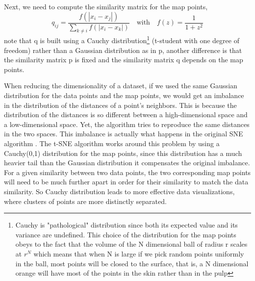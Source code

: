 \documentclass[12pt]{report}
\begin{document}
Next, we need to compute the similarity matrix for the map points,
\begin{equation}
q_{ij} = \frac{f(\left| x_i - x_j\right|)}{\displaystyle\sum_{k \neq i} f(\left| x_i - x_k\right|)} \quad \textrm{with} \quad f(z) = \frac{1}{1+z^2}
\end{equation}
note that q is built using a Cauchy distribution\footnote{Cauchy is "pathological" distribution since both its expected value and its variance are undefined. This choice of the distribution for the map points obeys to the fact that the volume of the N dimensional ball of radius r scales at $r^N$ which means that when N is large if we pick random points uniformly in the ball, most points will be closed to the surface, that is, a N dimensional orange will have most of the points in the skin rather than in the pulp} 
(t-student with one degree of freedom) rather than a Gaussian distribution as in p, another difference is that the similarity matrix p is fixed and the similarity matrix q depends on the map points. 



When reducing the dimensionality of a dataset, if we used the same Gaussian distribution for the data points and the map points, we would get an imbalance in the distribution of the distances of a point's neighbors. This is because the distribution of the distances is so different between a high-dimensional space and a low-dimensional space. Yet, the algorithm tries to reproduce the same distances in the two spaces. This imbalance is actually what happens in the original SNE algorithm \cite{hinton2003stochastic}.
The t-SNE algorithm works around this problem by using a Cauchy(0,1) distribution for the map points, since this distribution has a much heavier tail than the Gaussian distribution it compensates the original imbalance. For a given similarity between two data points, the two corresponding map points will need to be much further apart in order for their similarity to match the data similarity. So Cauchy distribution leads to more effective data visualizations, where clusters of points are more distinctly separated.
\end{document}
